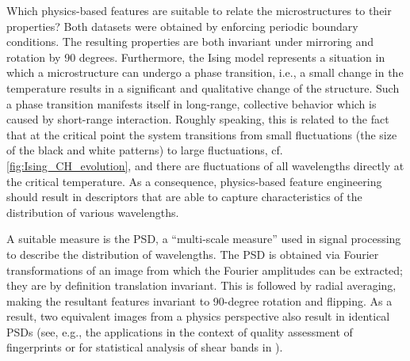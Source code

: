 \documentclass[11pt, authoryear]{elsarticle}
\begin{document}
	Which physics-based features are suitable to relate the microstructures to 
	their properties? Both datasets were obtained by enforcing periodic boundary
	conditions. The resulting properties are both invariant under
	mirroring and rotation by 90 degrees.
	Furthermore, the Ising model represents a situation in which a 
	microstructure can undergo a phase transition, i.e., a small change in the 
	temperature results in a significant and qualitative change of the structure. 
	Such a phase transition manifests itself in long-range, collective behavior 
	which is caused by short-range interaction.
	Roughly speaking, this is related to the fact that at the critical point the 
	system transitions from small fluctuations (the size of the black and white 
	patterns) to large fluctuations, cf. \cref{fig:Ising_CH_evolution}, and there 
	are fluctuations of all wavelengths directly at the critical temperature. As 
	a consequence, physics-based feature engineering should result in descriptors 
	that are able to capture characteristics of the distribution of various 
	wavelengths. 
	
	A suitable measure is the \gls{PSD}, a \enquote{multi-scale measure} used 
	in signal processing to describe the distribution of wavelengths. The 
	\gls{PSD} is obtained via Fourier transformations of an image from which the 
	Fourier amplitudes can be extracted; they are by definition translation 
	invariant. This is followed by radial averaging, making the resultant features 
	invariant to 90-degree rotation and flipping. As a result, two equivalent 
	images from a physics perspective also result in identical \glspl{PSD}
	(see, e.g., the applications in the context of quality assessment of 
	fingerprints \citep{Shen2022} or for statistical analysis of shear bands in
	\citep{Sandfeld_2014}). 
	
\end{document}

